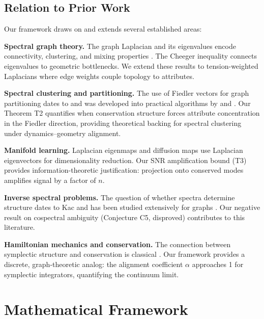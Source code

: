 \documentclass[12pt,letterpaper]{article}
\begin{document}
\subsection{Relation to Prior Work}

Our framework draws on and extends several established areas:

\textbf{Spectral graph theory.} The graph Laplacian and its eigenvalues encode connectivity, clustering, and mixing properties \citep{chung1997,fiedler1973,mohar1991}. The Cheeger inequality \citep{cheeger1970,alon1985} connects eigenvalues to geometric bottlenecks. We extend these results to tension-weighted Laplacians where edge weights couple topology to attributes.

\textbf{Spectral clustering and partitioning.} The use of Fiedler vectors for graph partitioning dates to \citet{fiedler1973} and was developed into practical algorithms by \citet{shi2000} and \citet{ng2002}. Our Theorem T2 quantifies when conservation structure forces attribute concentration in the Fiedler direction, providing theoretical backing for spectral clustering under dynamics--geometry alignment.

\textbf{Manifold learning.} Laplacian eigenmaps \citep{belkin2003} and diffusion maps \citep{coifman2006} use Laplacian eigenvectors for dimensionality reduction. Our SNR amplification bound (T3) provides information-theoretic justification: projection onto conserved modes amplifies signal by a factor of $n$.

\textbf{Inverse spectral problems.} The question of whether spectra determine structure dates to Kac \citep{kac1966} and has been studied extensively for graphs \citep{vandam2003,haemers2004}. Our negative result on cospectral ambiguity (Conjecture C5, disproved) contributes to this literature.

\textbf{Hamiltonian mechanics and conservation.} The connection between symplectic structure and conservation is classical \citep{arnold1989}. Our framework provides a discrete, graph-theoretic analog: the alignment coefficient $\alpha$ approaches 1 for symplectic integrators, quantifying the continuum limit.

\section{Mathematical Framework}
\label{sec:framework}
\end{document}
